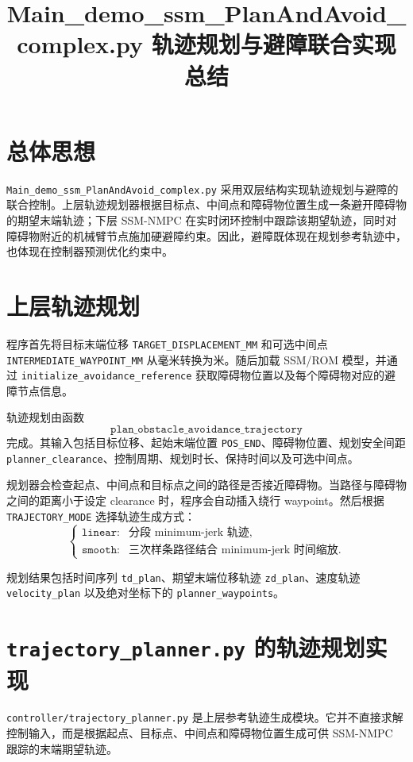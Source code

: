 \documentclass[11pt]{article}
\title{Main\_demo\_ssm\_PlanAndAvoid\_complex.py 轨迹规划与避障联合实现总结}
\author{}
\date{}
\begin{document}
\maketitle

\section{总体思想}

\texttt{Main\_demo\_ssm\_PlanAndAvoid\_complex.py} 采用双层结构实现轨迹规划与避障的联合控制。上层轨迹规划器根据目标点、中间点和障碍物位置生成一条避开障碍物的期望末端轨迹；下层 SSM-NMPC 在实时闭环控制中跟踪该期望轨迹，同时对障碍物附近的机械臂节点施加硬避障约束。因此，避障既体现在规划参考轨迹中，也体现在控制器预测优化约束中。

\section{上层轨迹规划}

程序首先将目标末端位移 \texttt{TARGET\_DISPLACEMENT\_MM} 和可选中间点 \texttt{INTERMEDIATE\_WAYPOINT\_MM} 从毫米转换为米。随后加载 SSM/ROM 模型，并通过 \texttt{initialize\_avoidance\_reference} 获取障碍物位置以及每个障碍物对应的避障节点信息。

轨迹规划由函数
\[
\texttt{plan\_obstacle\_avoidance\_trajectory}
\]
完成。其输入包括目标位移、起始末端位置 \texttt{POS\_END}、障碍物位置、规划安全间距 \texttt{planner\_clearance}、控制周期、规划时长、保持时间以及可选中间点。

规划器会检查起点、中间点和目标点之间的路径是否接近障碍物。当路径与障碍物之间的距离小于设定 clearance 时，程序会自动插入绕行 waypoint。然后根据 \texttt{TRAJECTORY\_MODE} 选择轨迹生成方式：
\[
\begin{cases}
\texttt{linear}: & \text{分段 minimum-jerk 轨迹},\\
\texttt{smooth}: & \text{三次样条路径结合 minimum-jerk 时间缩放}.
\end{cases}
\]

规划结果包括时间序列 \texttt{td\_plan}、期望末端位移轨迹 \texttt{zd\_plan}、速度轨迹 \texttt{velocity\_plan} 以及绝对坐标下的 \texttt{planner\_waypoints}。

\section{\texttt{trajectory\_planner.py} 的轨迹规划实现}

\texttt{controller/trajectory\_planner.py} 是上层参考轨迹生成模块。它并不直接求解控制输入，而是根据起点、目标点、中间点和障碍物位置生成可供 SSM-NMPC 跟踪的末端期望轨迹。
\end{document}
